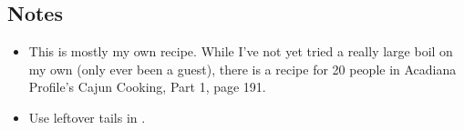 \begin{multicols}{2}
\begin{enumerate}
\end{enumerate}

\subsection*{Notes}
\begin{itemize}
    \item This is mostly my own recipe. While I've not yet tried a really large boil on my own (only ever been a guest), there is a recipe for 20 people in Acadiana Profile's Cajun Cooking, Part 1, page 191.
    \item Use leftover tails in .
\end{itemize}
\end{multicols}
\clearpage